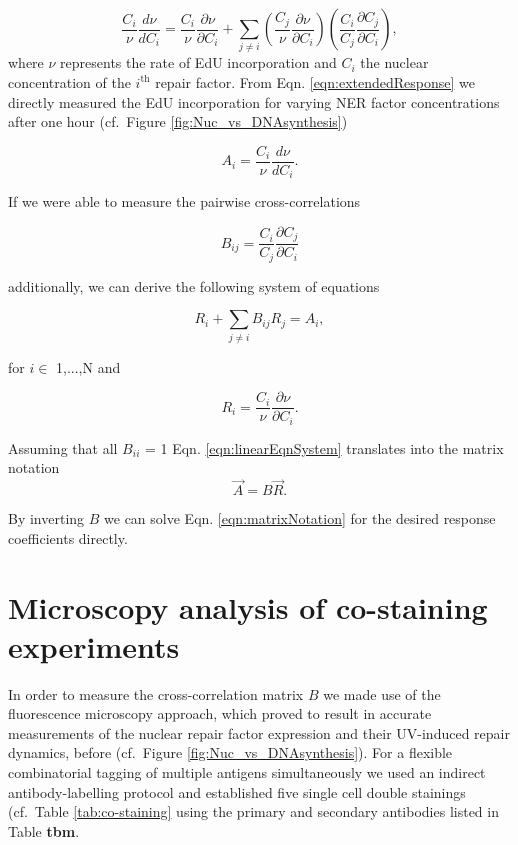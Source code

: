 \begin{equation}
\frac{C_i}{\nu}\frac{d \nu}{d C_i} = \frac{C_i}{\nu}\frac{\partial \nu}{\partial C_i} + \sum_{j \neq i} \left( \frac{C_j}{\nu}\frac{\partial \nu}{\partial C_i}\right) \left(\frac{C_i}{C_j}\frac{\partial C_j}{\partial C_i}\right), 
\label{eqn:extendedResponse}
\end{equation}    
where $\nu$ represents the rate of EdU incorporation and $C_i$ the nuclear concentration of the $i^{\text{th}}$ repair factor. From Eqn. \ref{eqn:extendedResponse} we directly measured the EdU incorporation for varying NER factor concentrations after one hour (cf.\ Figure \ref{fig:Nuc_vs_DNAsynthesis})

\begin{equation}
A_i = \frac{C_i}{\nu}\frac{d \nu}{d C_i}. \nonumber
\end{equation}

If we were able to measure the pairwise cross-correlations

\begin{equation}
B_{ij} = \frac{C_i}{C_j}\frac{\partial C_j}{\partial C_i} \nonumber
\end{equation}

additionally, we can derive the following system of equations


\begin{equation}
R_i + \sum_{j\neq i} B_{ij}R_j = A_i,
\label{eqn:linearEqnSystem}
\end{equation}

for $i \in$ 1,...,N and

\begin{equation}
R_i = \frac{C_i}{\nu}\frac{\partial \nu}{\partial C_i}.
\label{eqn:responseCoefficientsII}
\end{equation}

Assuming that all $B_{ii}$ = 1 Eqn. \ref{eqn:linearEqnSystem} translates into the matrix notation 
\begin{equation}
\vec{A} = B\vec{R}.
\label{eqn:matrixNotation}
\end{equation}

By inverting $B$ we can solve Eqn. \ref{eqn:matrixNotation} for the desired response coefficients directly. 


\section{Microscopy analysis of co-staining experiments}

In order to measure the cross-correlation matrix $B$ we made use of the fluorescence microscopy approach, which proved to result in accurate measurements of the nuclear repair factor expression and their UV-induced repair dynamics, before (cf.\ Figure \ref{fig:Nuc_vs_DNAsynthesis}). For a flexible combinatorial tagging of multiple antigens simultaneously we used an indirect antibody-labelling protocol and established five single cell double stainings (cf.\ Table \ref{tab:co-staining} using the primary and secondary antibodies listed in Table \textbf{tbm}. 


